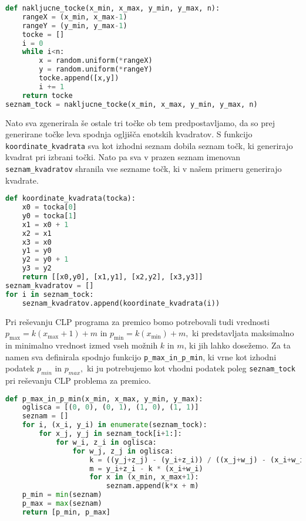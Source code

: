 \documentclass[a4paper]{article}
\begin{document}
\begin{lstlisting}[language=Python]
def nakljucne_tocke(x_min, x_max, y_min, y_max, n):
    rangeX = (x_min, x_max-1)
    rangeY = (y_min, y_max-1)
    tocke = []
    i = 0
    while i<n:
        x = random.uniform(*rangeX) 
        y = random.uniform(*rangeY)
        tocke.append([x,y])
        i += 1
    return tocke
seznam_tock = nakljucne_tocke(x_min, x_max, y_min, y_max, n)
\end{lstlisting}

Nato sva zgenerirala še ostale tri točke ob tem predpostavljamo, da so prej generirane točke leva spodnja ogljišča enotskih kvadratov. S funkcijo \texttt{koordinate\_kvadrata} sva kot izhodni seznam dobila seznam točk, ki generirajo kvadrat pri izbrani točki. Nato pa sva v prazen seznam imenovan \texttt{seznam\_kvadratov} shranila vse sezname točk, ki v našem primeru generirajo kvadrate.

\begin{lstlisting}[language=Python]
def koordinate_kvadrata(tocka):
    x0 = tocka[0]
    y0 = tocka[1]
    x1 = x0 + 1
    x2 = x1
    x3 = x0
    y1 = y0
    y2 = y0 + 1
    y3 = y2
    return [[x0,y0], [x1,y1], [x2,y2], [x3,y3]]
seznam_kvadratov = []  
for i in seznam_tock:
    seznam_kvadratov.append(koordinate_kvadrata(i))
\end{lstlisting}

Pri reševanju CLP programa za premico bomo potrebovali tudi vrednosti $p_{\max} = k (x_{\max}+1)+m$ in $p_{\min} = k (x_{\min})+m,$ ki predstavljata maksimalno in minimalno vrednost izmed vseh možnih $k$ in $m$, ki jih lahko dosežemo. Za ta namen sva definirala spodnjo funkcijo \texttt{p\_max\_in\_p\_min}, ki vrne kot izhodni podatek $p_{min}$ in $p_{max},$ ki ju potrebujemo kot vhodni podatek poleg \texttt{seznam\_tock} pri reševanju CLP problema za premico.

\begin{lstlisting}[language=Python]
def p_max_in_p_min(x_min, x_max, y_min, y_max):
    oglisca = [(0, 0), (0, 1), (1, 0), (1, 1)]
    seznam = []
    for i, (x_i, y_i) in enumerate(seznam_tock): 
        for x_j, y_j in seznam_tock[i+1:]: 
            for w_i, z_i in oglisca: 
                for w_j, z_j in oglisca: 
                    k = ((y_j+z_j) - (y_i+z_i)) / ((x_j+w_j) - (x_i+w_i))
                    m = y_i+z_i - k * (x_i+w_i)
                    for x in (x_min, x_max+1): 
                        seznam.append(k*x + m)
    p_min = min(seznam)
    p_max = max(seznam)
    return [p_min, p_max]
\end{lstlisting}
\end{document}

